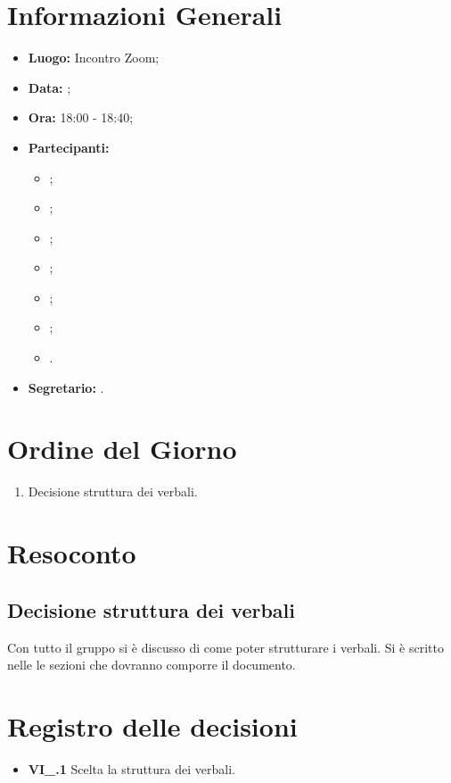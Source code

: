 \section{Informazioni Generali}
\begin{itemize}
\item \textbf{Luogo:} Incontro Zoom;
\item \textbf{Data:} \Data;
\item \textbf{Ora:} 18:00 - 18:40;
\item \textbf{Partecipanti:}
	\begin{itemize}
		\item \BL{}; 
		\item \FF{};
		\item \MM{}; 
		\item \PC{};
		\item \TG{};
		\item \TL{};
		\item \VD{}.
	\end{itemize} 
\item \textbf{Segretario:} \PC{}.
\end{itemize}

\section{Ordine del Giorno}
\begin{enumerate}
 \item Decisione struttura dei verbali.
\end{enumerate}

\section{Resoconto}
\subsection{Decisione struttura dei verbali}
Con tutto il gruppo si è discusso di come poter strutturare i verbali. Si è scritto nelle \NdP le sezioni che dovranno comporre il documento.

\section{Registro delle decisioni}
\begin{itemize}
  \item \textbf{VI\_\Data.1} Scelta la struttura dei verbali.
\end{itemize}